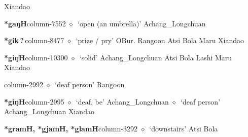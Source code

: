          Xiandao 
  \item {\footnotesize \textbf{*gaŋH}}{\tiny column-7552}
         $\diamond$~`open (an umbrella)'
         Achang\_Longchuan 
  \item {\footnotesize \textbf{*gik\,?\,}}{\tiny column-8477}
         $\diamond$~`prize / pry'
         OBur. 
\hspace{1ex}
         Rangoon 
\hspace{1ex}
         Atsi 
\hspace{1ex}
         Bola 
\hspace{1ex}
         Maru 
\hspace{1ex}
         Xiandao 
  \item {\footnotesize \textbf{*giŋH}}{\tiny column-10300}
         $\diamond$~`solid'
         Achang\_Longchuan 
\hspace{1ex}
         Atsi 
\hspace{1ex}
         Bola 
\hspace{1ex}
         Lashi 
\hspace{1ex}
         Maru 
\hspace{1ex}
         Xiandao 
  \item {\footnotesize \textbf{}}{\tiny column-2992}
         $\diamond$~`deaf person'
         Rangoon 
  \item {\footnotesize \textbf{*giŋH}}{\tiny column-2995}
         $\diamond$~`deaf, be'
         Achang\_Longchuan 
\hspace{1ex}
         $\diamond$~`deaf person'
         Achang\_Longchuan 
\hspace{1ex}
         Xiandao 
  \item {\footnotesize \textbf{*gramH, *gjamH, *glamH}}{\tiny column-3292}
         $\diamond$~`downstairs'
         Atsi 
\hspace{1ex}
         Bola 
\hspace{1ex}
